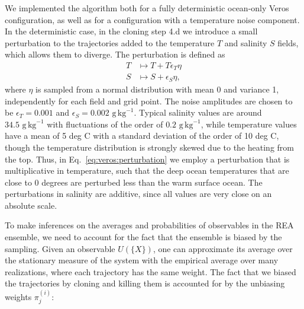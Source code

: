 We implemented the algorithm both for a fully deterministic ocean-only Veros configuration, as well as for a configuration with a temperature noise component. In the deterministic case, in the cloning step 4.d we introduce a small perturbation to the trajectories added to the temperature $T$ and salinity $S$ fields, which allows them to diverge. The perturbation is defined as
\begin{equation}\label{eq:veros:perturbation}
    \begin{aligned}
        T &\mapsto T + T\epsilon_T \eta \\
        S &\mapsto S + \epsilon_S \eta ,
    \end{aligned}
\end{equation}
where $\eta$ is sampled from a normal distribution with mean 0 and variance 1, independently for each field and grid point. The noise amplitudes are chosen to be $\epsilon_T = 0.001$ and $\epsilon_S = 0.002 \,\, \text{g} \, \text{kg}^{-1}$. Typical salinity values are around $34.5 \,\, \text{g} \, \text{kg}^{-1}$ with fluctuations of the order of $0.2 \,\, \text{g} \, \text{kg}^{-1}$, while temperature values have a mean of 5 deg C with a standard deviation of the order of 10 deg C, though the temperature distribution is strongly skewed due to the heating from the top. Thus, in Eq.~\ref{eq:veros:perturbation} we employ a perturbation that is multiplicative in temperature, such that the deep ocean temperatures that are close to 0 degrees are perturbed less than the warm surface ocean. The perturbations in salinity are additive, since all values are very close on an absolute scale.




To make inferences on the averages and probabilities of observables in the REA ensemble, we need to account for the fact that the ensemble is biased by the sampling.
Given an observable $U(\{X\})$, one can approximate its average over the stationary measure of the system with the empirical average over many realizations, where each trajectory has the same weight. The fact that we biased the trajectories by cloning and killing them is accounted for by the unbiasing weights $\pi_j^{(i)}$:

